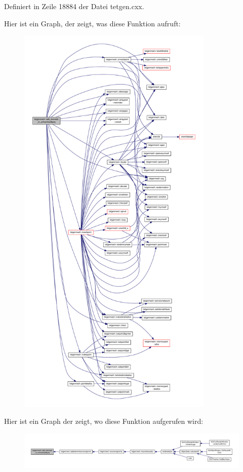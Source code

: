Definiert in Zeile 18884 der Datei tetgen.\-cxx.



Hier ist ein Graph, der zeigt, was diese Funktion aufruft\-:
\nopagebreak
\begin{figure}[H]
\begin{center}
\leavevmode
\includegraphics[height=550pt]{classtetgenmesh_acb5fc751eaa4a4ddffbebedfa7b7382a_cgraph}
\end{center}
\end{figure}




Hier ist ein Graph der zeigt, wo diese Funktion aufgerufen wird\-:
\nopagebreak
\begin{figure}[H]
\begin{center}
\leavevmode
\includegraphics[width=350pt]{classtetgenmesh_acb5fc751eaa4a4ddffbebedfa7b7382a_icgraph}
\end{center}
\end{figure}


